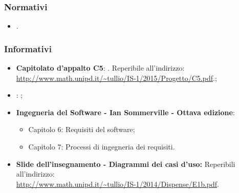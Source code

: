 \subsubsection{Normativi}
\begin{itemize}
\item \textit{\NdPv}. 
\end{itemize}

\subsubsection{Informativi}
\begin{itemize}
	\item
	\textbf{Capitolato d'appalto C5}: \progetto. Reperibile all'indirizzo: \\
	\url{http://www.math.unipd.it/~tullio/IS-1/2015/Progetto/C5.pdf}.;
	\item
	\textbf{\SdF}: \textit{\SdFv};
	\item
	\textbf{Ingegneria del Software - Ian Sommerville - Ottava edizione}:
	\begin{itemize}
		\item Capitolo 6: Requisiti del software;
		\item Capitolo 7: Processi di ingegneria dei requisiti.
	\end{itemize} 
	\item
	\textbf{Slide dell’insegnamento - Diagrammi dei casi d’uso:}  Reperibili all'indirizzo: \\ \url{http://www.math.unipd.it/~tullio/IS-1/2014/Dispense/E1b.pdf}.
\end{itemize}